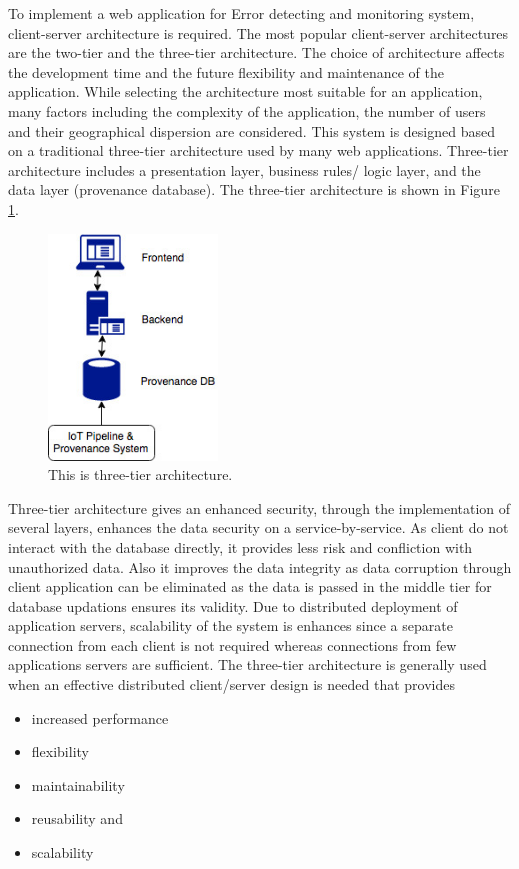 \documentclass[11pt]{report}
\begin{document}
    To  implement  a  web  application for Error detecting and monitoring system, client-server  architecture  is  required.  The  most  popular  client-server architectures  are  the  two-tier  and  the  three-tier architecture. The choice   of   architecture   affects   the   development   time   and   the   future   flexibility   and maintenance  of  the  application.  While  selecting the  architecture  most  suitable  for  an  application, many  factors  including  the complexity  of  the  application,  the  number  of  users and their geographical dispersion are considered. This system  is designed  based  on  a  traditional  three-tier  architecture  used  by  many  web  applications. Three-tier architecture  includes  a  presentation layer,  business  rules/  logic  layer, and the data layer (provenance database). The three-tier architecture is shown in Figure \ref{fig:architecture}.

    \begin{figure}
        \centering
        \includegraphics[width=0.4\textwidth]{figures/architecture.jpg}
        \caption{\label{fig:architecture}This is three-tier architecture.}
    \end{figure}

    Three-tier architecture gives an enhanced security, through the implementation of several layers, enhances the data security on a service-by-service. As client do not interact with the database directly, it provides less risk and confliction with unauthorized data. Also it improves the data integrity as data corruption through client application can be eliminated as the data is passed in the middle tier for database updations ensures its validity. Due to distributed deployment of application servers, scalability of the system is enhances since a separate connection from each client is not required whereas connections from few applications servers are sufficient.
    \newline
    \newline
    The three-tier architecture is generally used when an effective   distributed client/server design is needed that provides
    \begin{itemize}
        \item increased performance
        \item flexibility
        \item maintainability
        \item reusability and
        \item scalability
    \end{itemize}
\end{document}

